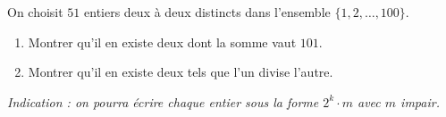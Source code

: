 On choisit $51$ entiers deux à deux distincts dans l'ensemble
$\{1, 2, \ldots, 100\}$.

\begin{enumerate}
  \item Montrer qu'il en existe deux dont la somme vaut $101$.
  \item Montrer qu'il en existe deux tels que l'un divise l'autre.
\end{enumerate}

\emph{Indication : on pourra écrire chaque entier sous la forme
$2^k \cdot m$ avec $m$ impair.}
